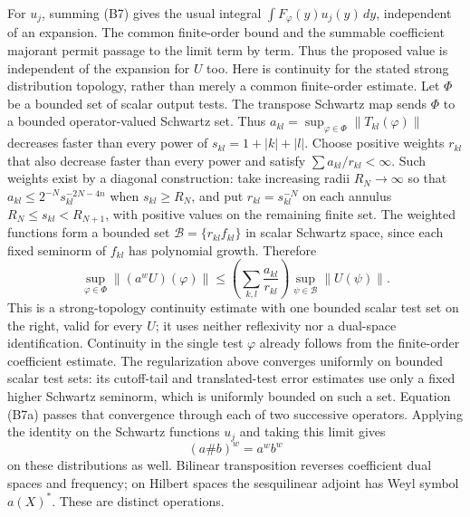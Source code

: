 \documentclass[
  11pt,
]{article}
\begin{document}
For \(u_j\), summing (B7) gives the usual integral
\(\int F_\varphi(y)u_j(y)\,dy\), independent of an expansion. The common
finite-order bound and the summable coefficient majorant permit passage
to the limit term by term. Thus the proposed value is independent of the
expansion for \(U\) too. Here is continuity for the stated strong
distribution topology, rather than merely a common finite-order
estimate. Let \(\Phi\) be a bounded set of scalar output tests. The
transpose Schwartz map sends \(\Phi\) to a bounded operator-valued
Schwartz set. Thus \(a_{kl}=\sup_{\varphi\in\Phi}\|T_{kl}(\varphi)\|\)
decreases faster than every power of \(s_{kl}=1+|k|+|l|\). Choose
positive weights \(r_{kl}\) that also decrease faster than every power
and satisfy \(\sum a_{kl}/r_{kl}<\infty\). Such weights exist by a
diagonal construction: take increasing radii \(R_N\to\infty\) so that
\(a_{kl}\le2^{-N}s_{kl}^{-2N-4n}\) when \(s_{kl}\ge R_N\), and put
\(r_{kl}=s_{kl}^{-N}\) on each annulus \(R_N\le s_{kl}<R_{N+1}\), with
positive values on the remaining finite set. The weighted functions form
a bounded set \(\mathcal B=\{r_{kl}f_{kl}\}\) in scalar Schwartz space,
since each fixed seminorm of \(f_{kl}\) has polynomial growth. Therefore
\[
 \sup_{\varphi\in\Phi}\|(a^wU)(\varphi)\|
 \le\left(\sum_{k,l}\frac{a_{kl}}{r_{kl}}\right)
       \sup_{\psi\in\mathcal B}\|U(\psi)\|.
 \tag{B7a}
\] This is a strong-topology continuity estimate with one bounded scalar
test set on the right, valid for every \(U\); it uses neither
reflexivity nor a dual-space identification. Continuity in the single
test \(\varphi\) already follows from the finite-order coefficient
estimate. The regularization above converges uniformly on bounded scalar
test sets: its cutoff-tail and translated-test error estimates use only
a fixed higher Schwartz seminorm, which is uniformly bounded on such a
set. Equation (B7a) passes that convergence through each of two
successive operators. Applying the identity on the Schwartz functions
\(u_j\) and taking this limit gives \[
 (a\#b)^w=a^w b^w
 \tag{B8}
\] on these distributions as well. Bilinear transposition reverses
coefficient dual spaces and frequency; on Hilbert spaces the
sesquilinear adjoint has Weyl symbol \(a(X)^*\). These are distinct
operations.
\end{document}

